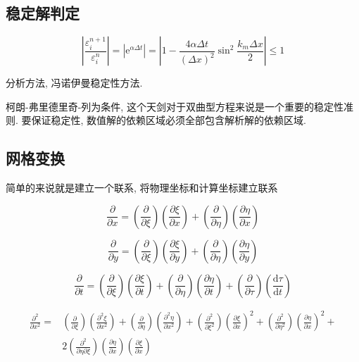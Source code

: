 \subsection{稳定解判定}
$$
	\left|\frac{\varepsilon_{i}^{n+1}}{\varepsilon_{i}^{n}}\right|=\left|\mathrm{e}^{\alpha \Delta t}\right|=\left|1-\frac{4 \alpha \Delta t}{(\Delta x)^{2}} \sin ^{2} \frac{k_{m} \Delta x}{2}\right| \leqslant 1
$$

分析方法, 冯诺伊曼稳定性方法.

柯朗-弗里德里奇-列为条件, 这个天剑对于双曲型方程来说是一个重要的稳定性准则. 要保证稳定性, 数值解的依赖区域必须全部包含解析解的依赖区域.

\subsection{网格变换}
简单的来说就是建立一个联系, 将物理坐标和计算坐标建立联系

$$
	\frac{\partial}{\partial x}=\left(\frac{\partial}{\partial \xi}\right)\left(\frac{\partial \xi}{\partial x}\right)+\left(\frac{\partial}{\partial \eta}\right)\left(\frac{\partial \eta}{\partial x}\right)
$$

$$
	\frac{\partial}{\partial y}=\left(\frac{\partial}{\partial \xi}\right)\left(\frac{\partial \xi}{\partial y}\right)+\left(\frac{\partial}{\partial \eta}\right)\left(\frac{\partial \eta}{\partial y}\right)
$$

$$
	\frac{\partial}{\partial t}=\left(\frac{\partial}{\partial \xi}\right)\left(\frac{\partial \xi}{\partial t}\right)+\left(\frac{\partial}{\partial \eta}\right)\left(\frac{\partial \eta}{\partial t}\right)+\left(\frac{\partial}{\partial \tau}\right)\left(\frac{\mathrm{d} \tau}{\mathrm{d} t}\right)
$$

$$
	\begin{aligned}
		\frac{\partial^{2}}{\partial x^{2}}= & \left(\frac{\partial}{\partial \xi}\right)\left(\frac{\partial^{2} \xi}{\partial x^{2}}\right)+\left(\frac{\partial}{\partial \eta}\right)\left(\frac{\partial^{2} \eta}{\partial x^{2}}\right)+\left(\frac{\partial^{2}}{\partial \xi^{2}}\right)\left(\frac{\partial \xi}{\partial x}\right)^{2}+\left(\frac{\partial^{2}}{\partial \eta^{2}}\right)\left(\frac{\partial \eta}{\partial x}\right)^{2}+ \\
		                                     & 2\left(\frac{\partial^{2}}{\partial \eta \partial \xi}\right)\left(\frac{\partial \eta}{\partial x}\right)\left(\frac{\partial \xi}{\partial x}\right)
	\end{aligned}
$$

